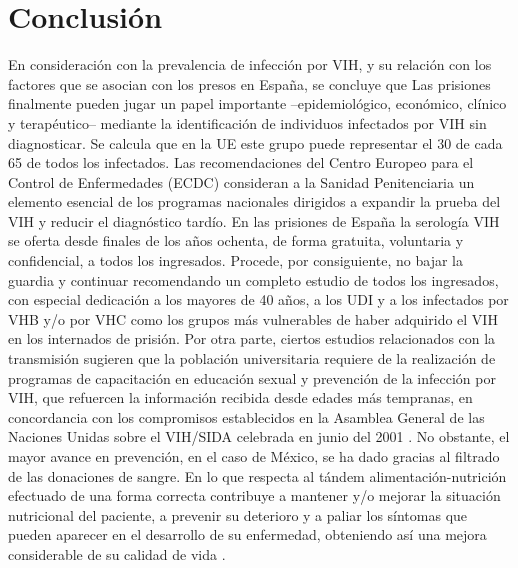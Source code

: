 \documentclass[a4paper,twocolumn,10pt]{article}
\begin{document}
\section{Conclusión}
En consideración con la prevalencia de infección por VIH, y su relación con los factores que se asocian con los presos en España, se concluye que Las prisiones finalmente pueden jugar un papel importante –epidemiológico, económico, clínico y  terapéutico– mediante la identificación de individuos infectados por VIH sin diagnosticar. Se calcula que en la UE este grupo puede representar el 30 de cada 65 de todos los infectados. Las recomendaciones del Centro Europeo para el Control de Enfermedades (ECDC) consideran a la Sanidad Penitenciaria un elemento esencial de los programas nacionales dirigidos a expandir la prueba del VIH y reducir el diagnóstico tardío. En las prisiones de España la serología VIH se oferta desde finales de los años ochenta, de forma gratuita, voluntaria y confidencial, a todos los ingresados. Procede, por consiguiente, no bajar la guardia y continuar recomendando un completo estudio de todos los ingresados, con especial dedicación a los mayores de 40 años, a los UDI y a los infectados por VHB y/o por VHC como los grupos más vulnerables de haber adquirido el VIH en los internados de prisión. \cite{Marco2012}\newline \newline
Por otra parte, ciertos estudios relacionados con la transmisión sugieren que la población universitaria requiere de la realización de programas de capacitación en educación sexual y prevención de la infección por VIH, que refuercen la información recibida desde edades más tempranas, en concordancia con los compromisos establecidos en la Asamblea  General de las Naciones Unidas sobre el VIH/SIDA celebrada en junio del 2001 \cite{LinaMariaVera2004}. No obstante, el mayor avance en prevención, en el  caso de México, se ha dado gracias al filtrado de las donaciones de sangre. \newline \newline
En lo que respecta al tándem alimentación-nutrición efectuado de una forma correcta contribuye a mantener y/o mejorar la situación nutricional del paciente, a prevenir su deterioro y a paliar los síntomas que pueden aparecer en el desarrollo de su enfermedad, obteniendo así una mejora considerable de su calidad de vida \cite{Herrera2004}.


\end{document}
